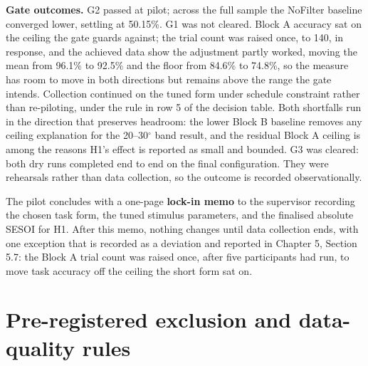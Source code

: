 \textbf{Gate outcomes.} G2 passed at pilot; across the full sample the NoFilter baseline converged
lower, settling at 50.15\%. G1 was not cleared. Block A accuracy sat on the
ceiling the gate guards against; the trial count was raised once, to 140, in response, and the
achieved data show the adjustment partly worked, moving the mean from 96.1\% to 92.5\% and the
floor from 84.6\% to 74.8\%, so the measure has room to move in both directions but remains above
the range the gate intends. Collection continued on the tuned form under schedule constraint
rather than re-piloting, under the rule in row 5 of the decision table. Both shortfalls run in the
direction that preserves headroom: the lower Block B baseline removes any ceiling explanation for the 20--30$^{\circ}$ band
result, and the residual Block A ceiling is among the reasons H1's effect is reported as small and
bounded. G3 was cleared: both dry runs completed end to end on the final configuration. They were
rehearsals rather than data collection, so the outcome is recorded observationally.

The pilot concludes with a one-page \textbf{lock-in memo} to the supervisor recording the chosen task
form, the tuned stimulus parameters, and the finalised absolute SESOI for H1. After this memo,
nothing changes until data collection ends, with one exception that is recorded as a deviation and
reported in Chapter 5, Section 5.7: the Block A trial count was raised once, after five participants
had run, to move task accuracy off the ceiling the short form sat on.


\section{Pre-registered exclusion and data-quality rules}

